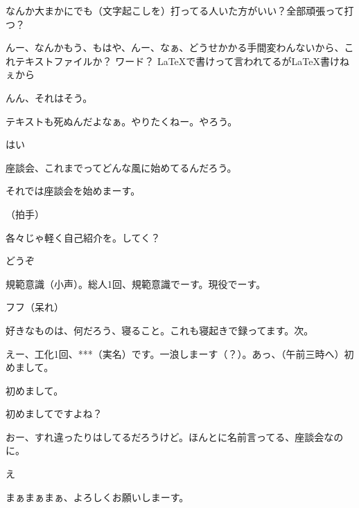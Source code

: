 \begin{multicols}{3}

    {\footnotesize

    
    

    

        なんか大まかにでも（文字起こしを）打ってる人いた方がいい？全部頑張って打つ？

        んー、なんかもう、もはや、んー、なぁ、どうせかかる手間変わんないから、これテキストファイルか？ ワード？ \LaTeX で書けって言われてるが\LaTeX 書けねぇから

        んん、それはそう。

        テキストも死ぬんだよなぁ。やりたくねー。やろう。

        はい

        座談会、これまでってどんな風に始めてるんだろう。

        それでは座談会を始めまーす。

        （拍手）

        各々じゃ軽く自己紹介を。してく？

        どうぞ

        規範意識（小声）。総人1回、規範意識でーす。現役でーす。

        フフ（呆れ）

        好きなものは、何だろう、寝ること。これも寝起きで録ってます。次。

        えー、工化1回、***（実名）です。一浪しまーす（？）。あっ、（午前三時へ）初めまして。

        初めまして。


        初めましてですよね？

        おー、すれ違ったりはしてるだろうけど。ほんとに名前言ってる、座談会なのに。

        え

        まぁまぁまぁ、よろしくお願いしまーす。

}
\end{multicols}
